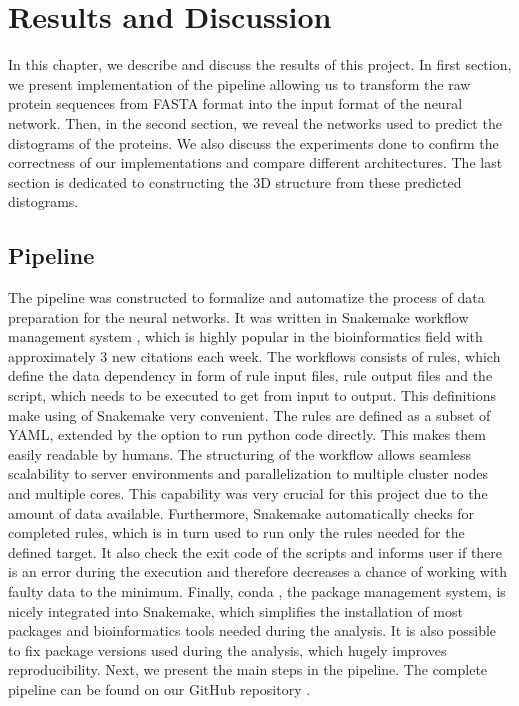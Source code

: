 \chapter{Results and Discussion}
In this chapter, we describe and discuss the results of this project.
In first section, we present implementation of the pipeline allowing us to transform the raw protein sequences from FASTA format into the input format of the neural network.
Then, in the second section, we reveal the networks used to predict the distograms of the proteins.
We also discuss the experiments done to confirm the correctness of our implementations and compare different architectures.
The last section is dedicated to constructing the 3D structure from these predicted distograms.

\section{Pipeline}
The pipeline was constructed to formalize and automatize the process of data preparation for the neural networks.
It was written in Snakemake workflow management system \cite{koster2012snakemake}, which is highly popular in the bioinformatics field with approximately 3 new citations each week.
The workflows consists of rules, which define the data dependency in form of rule input files, rule output files and the script, which needs to be executed to get from input to output. 
This definitions make using of Snakemake very convenient.
The rules are defined as a subset of YAML, extended by the option to run python code directly.
This makes them easily readable by humans.
The structuring of the workflow allows seamless scalability to server environments and parallelization to multiple cluster nodes and multiple cores.
This capability was very crucial for this project due to the amount of data available.
Furthermore, Snakemake automatically checks for completed rules, which is in turn used to run only the rules needed for the defined target.
It also check the exit code of the scripts and informs user if there is an error during the execution and therefore decreases a chance of working with faulty data to the minimum.
Finally, conda \cite{conda}, the package management system, is nicely integrated into Snakemake, which simplifies the installation of most packages and bioinformatics tools needed during the analysis.
It is also possible to fix package versions used during the analysis, which hugely improves reproducibility.
Next, we present the main steps in the pipeline.
The complete pipeline can be found on our GitHub repository \cite{github}.

